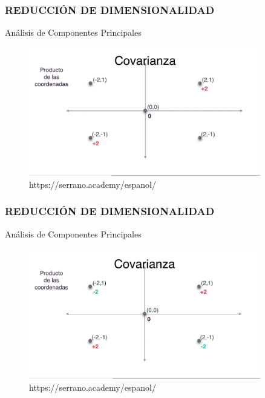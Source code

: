\documentclass{beamer}
\begin{document}
\begin{frame}
	\frametitle{REDUCCIÓN DE DIMENSIONALIDAD}
	\begin{block}{Análisis de Componentes Principales}	
		\begin{figure}
			\includegraphics[width=0.9\textwidth]{PCA/IMG_3555.jpg}
			\caption{https://serrano.academy/espanol/}
		\end{figure}
	\end{block}
\end{frame}


\begin{frame}
	\frametitle{REDUCCIÓN DE DIMENSIONALIDAD}
	\begin{block}{Análisis de Componentes Principales}	
		\begin{figure}
			\includegraphics[width=0.9\textwidth]{PCA/IMG_3556.jpg}
			\caption{https://serrano.academy/espanol/}
		\end{figure}
	\end{block}
\end{frame}
\end{document}
